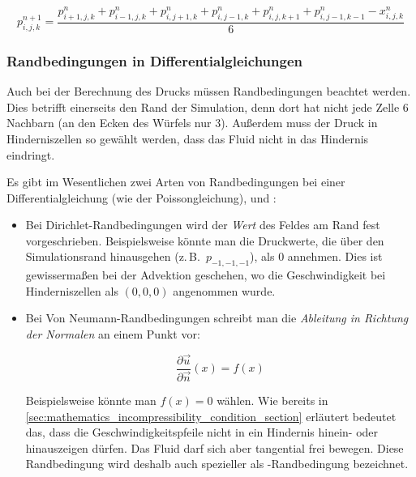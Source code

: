 \begin{equation*}
p_{i,j,k}^{n+1}
=
\frac{
	p_{i+1,j,k}^n +
	p_{i-1,j,k}^n +
	p_{i,j+1,k}^n +
	p_{i,j-1,k}^n +
	p_{i,j,k+1}^n +
	p_{i,j-1,k-1}^n -
	x_{i,j,k}^n
}
{
	6
}
\end{equation*}

\subsubsection{Randbedingungen in Differentialgleichungen}
\label{sec:stam_boundaries}

Auch bei der Berechnung des Drucks müssen Randbedingungen beachtet werden. Dies
betrifft einerseits den Rand der Simulation, denn dort hat nicht jede Zelle 6
Nachbarn (an den Ecken des Würfels nur 3). Außerdem muss der Druck in
Hinderniszellen so gewählt werden, dass das Fluid nicht in das Hindernis
eindringt.

Es gibt im Wesentlichen zwei Arten von Randbedingungen bei einer
Differentialgleichung (wie der Poissongleichung),
 und
:

\begin{itemize}
\item
	Bei Dirichlet-Randbedingungen wird der \emph{Wert} des Feldes am Rand
	fest vorgeschrieben. Beispielsweise könnte man die Druckwerte, die über
	den Simulationsrand hinausgehen (z.\,B.\ $p_{-1,-1,-1}$), als $0$ annehmen.
	Dies ist gewissermaßen bei der Advektion geschehen, wo die
	Geschwindigkeit bei Hinderniszellen als $(0,0,0)$ angenommen wurde.
\item
	Bei Von Neumann-Randbedingungen schreibt man die \emph{Ableitung in
	Richtung der Normalen} an einem Punkt vor:

	\begin{equation}
	\frac{
		\partial \vec{u}
	}
	{
		\partial \vec{n}
	}(x)
	=
	f(x)
	\end{equation}

	Beispielsweise könnte man $f(x)=0$ wählen. Wie bereits in
	\autoref{sec:mathematics_incompressibility_condition_section} erläutert
	bedeutet das, dass die Geschwindigkeitspfeile nicht in ein Hindernis
	hinein- oder hinauszeigen dürfen. Das Fluid darf sich aber tangential
	frei bewegen. Diese Randbedingung wird deshalb auch spezieller als
	-Randbedingung bezeichnet.
\end{itemize}

